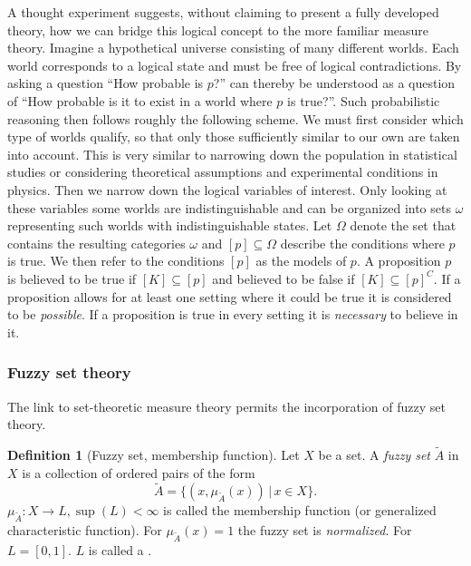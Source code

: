 \documentclass[
]{report}
\theoremstyle{definition}
\theoremstyle{definition}
\newtheorem{definition}{Definition}[section]
\begin{document}
A thought experiment suggests, without claiming to present a fully
developed theory, how we can bridge this logical concept to the more
familiar measure theory. Imagine a hypothetical universe consisting of
many different worlds. Each world corresponds to a logical state and
must be free of logical contradictions. By asking a question ``How
probable is \(p\)?'' can thereby be understood as a question of ``How
probable is it to exist in a world where \(p\) is true?''. Such
probabilistic reasoning then follows roughly the following scheme. We
must first consider which type of worlds qualify, so that only those
sufficiently similar to our own are taken into account. This is very
similar to narrowing down the population in statistical studies or
considering theoretical assumptions and experimental conditions in
physics. Then we narrow down the logical variables of interest. Only
looking at these variables some worlds are indistinguishable and can be
organized into sets \(\omega\) representing such worlds with
indistinguishable states. Let \(\Omega\) denote the set that contains
the resulting categories \(\omega\) and \([p] \subseteq \Omega\)
describe the conditions where \(p\) is true. We then refer to the
conditions \([p]\) as the models of \(p\). A proposition \(p\) is
believed to be true if \([K] \subseteq [p]\) and believed to be false if
\([K] \subseteq [p]^C\). If a proposition allows for at least one
setting where it could be true it is considered to be \textit{possible}.
If a proposition is true in every setting it is \textit{necessary} to
believe in it.

\subsubsection{Fuzzy set theory}

The link to set-theoretic measure theory permits the incorporation of
fuzzy set theory.

\begin{definition}[Fuzzy set, membership function]
Let $X$ be a set. A \textit{fuzzy set} $\tilde{A}$ in $X$ is a collection of ordered pairs of the form
$$\tilde{A} = \big\{ (x, \mu_{\tilde{A}}(x)) \, | \, x \in X \big\}.$$
$\mu_{\tilde{A}}: X \rightarrow L, \sup(L) < \infty$ is called the membership function (or generalized characteristic function). For $\mu_{\tilde{A}} (x) = 1$ the fuzzy set is \textit{normalized}. For $L = [0,1]$. $L$ is called a .
\end{definition}
\end{document}
